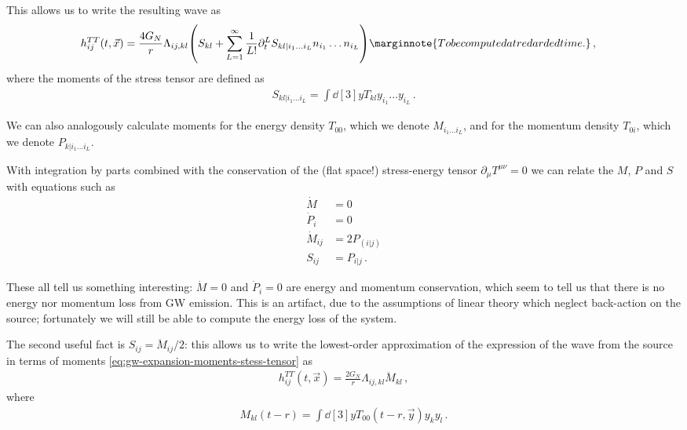 \documentclass[main.tex]{subfiles}
\begin{document}
This allows us to write the resulting wave as 
%
\begin{align} \label{eq:gw-expansion-moments-stess-tensor}
h_{ij}^{TT} (t, \vec{x}) &= \frac{4G_N}{r} \Lambda_{ij, kl} \qty(S_{kl} + \sum_{L=1}^{\infty } \frac{1}{L!} \partial_{t}^{L} S_{kl | i_1 \dots i_L} n_{i_1} \dots n_{i_L})
\marginnote{To be computed at redarded time.}
\,,
\end{align}
%
where the moments of the stress tensor are defined as 
%
\begin{align}
S_{kl | i_1 \dots i_L} = \int \dd[3]{y} T_{kl} y_{i_1} \dots y_{i_L}
\,.
\end{align}

We can also analogously calculate moments for the energy density \(T_{00} \), which we denote \(M_{i_1 \dots i_L}\), and for the momentum density \(T_{0i}\), which we denote \(P_{k|i_1 \dots i_L}\). 

With integration by parts combined with the conservation of the (flat space!) stress-energy tensor \(\partial_{\mu } T^{\mu \nu }= 0\) we can relate the \(M\), \(P\) and \(S\) with equations such as \cite[eqs.\ 3.45--51]{maggioreGravitationalWavesVolume2007}
%
\begin{align}
\dot{M} &= 0  \\
\dot{P}_{i} &= 0 \\
\dot{M}_{ij} &= 2 P_{(i|j)}   \\
S_{ij} &= P_{i | j}
\,.
\end{align}

These all tell us something interesting: \(\dot{M} = 0\) and \(\dot{P}_{i} = 0\) are energy and momentum conservation, which seem to tell us that there is no energy nor momentum loss from \ac{GW} emission. 
This is an artifact, due to the assumptions of linear theory which neglect back-action on the source; fortunately we will still be able to compute the energy loss of the system.

The second useful fact is \(S_{ij} = \ddot{M}_{ij} / 2\): this allows us to write the lowest-order approximation of the expression of the wave from the source in terms of moments \eqref{eq:gw-expansion-moments-stess-tensor} as 
%
\begin{align}
h_{ij}^{TT}(t, \vec{x}) = \frac{2 G_N}{r} \Lambda_{ij, kl} \ddot{M}_{kl}
\,,
\end{align}
%
where 
%
\begin{align}
M_{kl}(t-r) = \int \dd[3]{y} T_{00}(t -r, \vec{y}) y_k y_l
\,.
\end{align}
\end{document}
